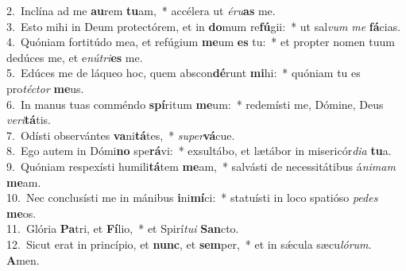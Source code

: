 {2.~}Inclína ad me \textbf{au}rem \textbf{tu}am,~* accélera ut \textit{é}\textit{ru}\textbf{as} me.\\
{3.~}Esto mihi in Deum protectórem, et in \textbf{do}mum re\textbf{fú}gii:~* ut sal\textit{vum} \textit{me} \textbf{fá}cias.\\
{4.~}Quóniam fortitúdo mea, et refúgium \textbf{me}um \textbf{es} tu:~* et propter nomen tuum dedúces me, et e\textit{nú}\textit{tri}\textbf{es} me.\\
{5.~}Edúces me de láqueo hoc, quem abscon\textbf{dé}runt \textbf{mi}hi:~* quóniam tu es pro\textit{té}\textit{ctor} \textbf{me}us.\\
{6.~}In manus tuas comméndo \textbf{spí}ritum \textbf{me}um:~* redemísti me, Dómine, Deus \textit{ve}\textit{ri}\textbf{tá}tis.\\
{7.~}Odísti observántes \textbf{va}ni\textbf{tá}tes,~* \textit{su}\textit{per}\textbf{vá}cue.\\
{8.~}Ego autem in Dómi\textbf{no} spe\textbf{rá}vi:~* exsultábo, et lætábor in misericór\textit{di}\textit{a} \textbf{tu}a.\\
{9.~}Quóniam respexísti humili\textbf{tá}tem \textbf{me}am,~* salvásti de necessitátibus á\textit{ni}\textit{mam} \textbf{me}am.\\
{10.~}Nec conclusísti me in mánibus \textbf{i}ni\textbf{mí}ci:~* statuísti in loco spatióso \textit{pe}\textit{des} \textbf{me}os.\\
{11.~}Glória \textbf{Pa}tri, et \textbf{Fí}lio,~* et Spirí\textit{tu}\textit{i} \textbf{San}cto.\\
{12.~}Sicut erat in princípio, et \textbf{nunc}, et \textbf{sem}per,~* et in sǽcula sæcu\textit{ló}\textit{rum}. \textbf{A}men.\\
